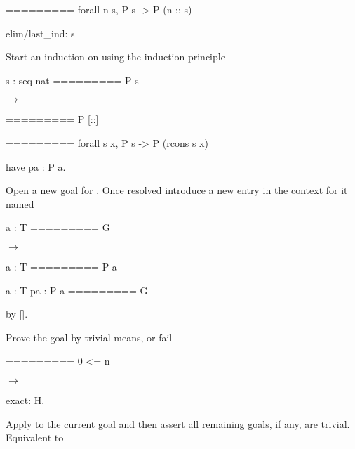 \begin{landscape}
\begin{small}
\begin{multicols*}{3}[\begin{center}\section*{}\end{center}]
\noindent\hspace{0.24\textwidth}
\begin{cheatout}
=========
 forall n s,
  P s -> P (n :: s)
\end{cheatout}

\begin{cheat}
elim/last_ind: s
\end{cheat}
  Start an induction on  using the induction
  principle 

\begin{cheatout}
 s : seq nat
=========
 P s
\end{cheatout}
$\to$
\begin{cheatout}
=========
 P [::]
\end{cheatout}

\noindent\hspace{0.24\textwidth}
\begin{cheatout}
=========
 forall s x,
  P s ->
   P (rcons s x)
\end{cheatout}

\columnbreak

\begin{cheat}
have pa : P a.
\end{cheat}
  Open a new goal for . Once resolved
  introduce a new entry in the context for it named 

\begin{cheatout}
 a : T
=========
 G
\end{cheatout}
$\to$
\begin{cheatout}
 a : T
=========
 P a
\end{cheatout}

\noindent\hspace{0.24\textwidth}
\begin{cheatout}
 a : T
 pa : P a
=========
 G
\end{cheatout}

\begin{cheat}
by [].
\end{cheat}
  Prove the goal by trivial means, or fail

\begin{cheatout}
=========
 0 <= n
\end{cheatout}
$\to$
\begin{cheatout}
\end{cheatout}

\begin{cheat}
exact: H.
\end{cheat}
  Apply  to the current goal and then assert all
  remaining goals, if any, are trivial. Equivalent to


\end{multicols*}
\end{small}
\end{landscape}
